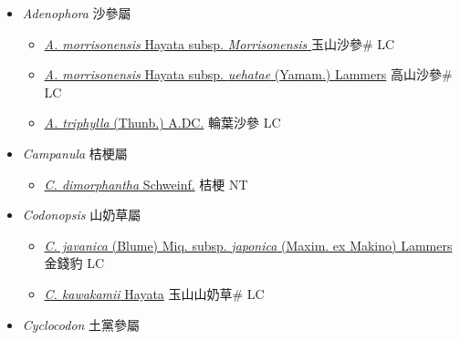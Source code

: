 
  \begin{itemize}
 \item[] \textit{Adenophora} 沙參屬
                    
  \begin{itemize}
        \item[] \href{http://www.theplantlist.org/tpl1.1/search?q=Adenophora+morrisonensis+subsp.+Morrisonensis}{\textit{A. morrisonensis} Hayata subsp. \textit{Morrisonensis} }   玉山沙參\# LC
        \item[] \href{http://www.theplantlist.org/tpl1.1/search?q=Adenophora+morrisonensis+subsp.+uehatae}{\textit{A. morrisonensis} Hayata subsp. \textit{uehatae} (Yamam.) Lammers}   高山沙參\# LC
        \item[] \href{http://www.theplantlist.org/tpl1.1/search?q=Adenophora+triphylla}{\textit{A. triphylla} (Thunb.) A.DC.}   輪葉沙參 LC
  \end{itemize}
 \item[] \textit{Campanula} 桔梗屬
                    
  \begin{itemize}
        \item[] \href{http://www.theplantlist.org/tpl1.1/search?q=Campanula+dimorphantha}{\textit{C. dimorphantha} Schweinf.}   桔梗 NT
  \end{itemize}
 \item[] \textit{Codonopsis} 山奶草屬
                    
  \begin{itemize}
        \item[] \href{http://www.theplantlist.org/tpl1.1/search?q=Codonopsis+javanica+subsp.+japonica}{\textit{C. javanica} (Blume) Miq. subsp. \textit{japonica} (Maxim. ex Makino) Lammers}   金錢豹 LC
        \item[] \href{http://www.theplantlist.org/tpl1.1/search?q=Codonopsis+kawakamii}{\textit{C. kawakamii} Hayata}   玉山山奶草\# LC
  \end{itemize}
 \item[] \textit{Cyclocodon} 土黨參屬
                    

\end{itemize}
